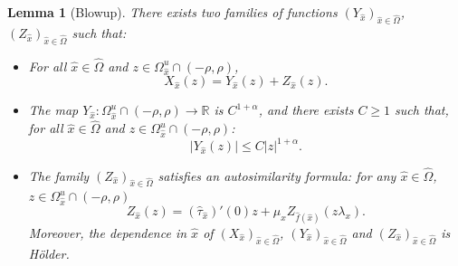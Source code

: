 \documentclass[a4paper]{article}
\newtheorem{lemma}[theorem]{Lemma}
\theoremstyle{definition}
\begin{document}
\begin{lemma}[Blowup]\label{lem:blow}
There exists two families of functions $(Y_{\widehat{x}})_{{\widehat{x}} \in \widehat{\Omega}}$, $(Z_{\widehat{x}})_{{\widehat{x}} \in \widehat{\Omega}}$ such that:
\begin{itemize}
\item For all ${\widehat{x}} \in \widehat{\Omega}$ and $z \in \Omega_{\widehat{x}}^u \cap (-\rho,\rho)$, $$X_{\widehat{x}}(z) = Y_{\widehat{x}}(z) + Z_{\widehat{x}}(z) .$$
\item The map $Y_{\widehat{x}} :  \Omega_{\widehat{x}}^u \cap (-\rho,\rho) \rightarrow \mathbb{R}$ is $C^{1+\alpha}$, and there exists $C \geq 1$ such that, for all ${\widehat{x}} \in \widehat{\Omega}$ and $z \in \Omega_{\widehat{x}}^u \cap (-\rho,\rho)$: $$|Y_{\widehat{x}}(z)| \leq C |z|^{1+\alpha}.$$
\item The family $(Z_{\widehat{x}})_{{\widehat{x}} \in \widehat{\Omega}}$ satisfies an autosimilarity formula: for any ${\widehat{x}} \in \widehat{\Omega}$, $z \in \Omega_{\widehat{x}}^u \cap (-\rho,\rho)$
$$ Z_{\widehat{x}}(z) = (\widehat{\tau}_{\widehat{x}})'(0) z + \mu_x Z_{\widehat{f}({\widehat{x}})}(z \lambda_x) .$$
Moreover, the dependence in ${\widehat{x}}$ of $(X_{\widehat{x}})_{{\widehat{x}} \in \widehat{\Omega}}$, $(Y_{\widehat{x}})_{{\widehat{x}} \in \widehat{\Omega}}$ and $(Z_{\widehat{x}})_{{\widehat{x}} \in \widehat{\Omega}}$ is Hölder.
\end{itemize}


\end{lemma}
\end{document}
